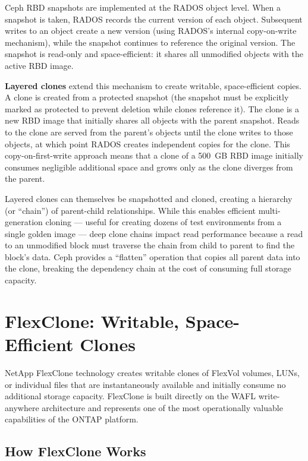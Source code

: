 Ceph RBD snapshots are implemented at the RADOS object level. When a snapshot is taken, RADOS records the current version of each object. Subsequent writes to an object create a new version (using RADOS's internal copy-on-write mechanism), while the snapshot continues to reference the original version. The snapshot is read-only and space-efficient: it shares all unmodified objects with the active RBD image.

\textbf{Layered clones} extend this mechanism to create writable, space-efficient copies. A clone is created from a protected snapshot (the snapshot must be explicitly marked as protected to prevent deletion while clones reference it). The clone is a new RBD image that initially shares all objects with the parent snapshot. Reads to the clone are served from the parent's objects until the clone writes to those objects, at which point RADOS creates independent copies for the clone. This copy-on-first-write approach means that a clone of a 500~GB RBD image initially consumes negligible additional space and grows only as the clone diverges from the parent.

Layered clones can themselves be snapshotted and cloned, creating a hierarchy (or ``chain'') of parent-child relationships. While this enables efficient multi-generation cloning --- useful for creating dozens of test environments from a single golden image --- deep clone chains impact read performance because a read to an unmodified block must traverse the chain from child to parent to find the block's data. Ceph provides a ``flatten'' operation that copies all parent data into the clone, breaking the dependency chain at the cost of consuming full storage capacity.

\section{FlexClone: Writable, Space-Efficient Clones}

NetApp FlexClone technology creates writable clones of FlexVol volumes, LUNs, or individual files that are instantaneously available and initially consume no additional storage capacity. FlexClone is built directly on the WAFL write-anywhere architecture and represents one of the most operationally valuable capabilities of the ONTAP platform.

\subsection{How FlexClone Works}

